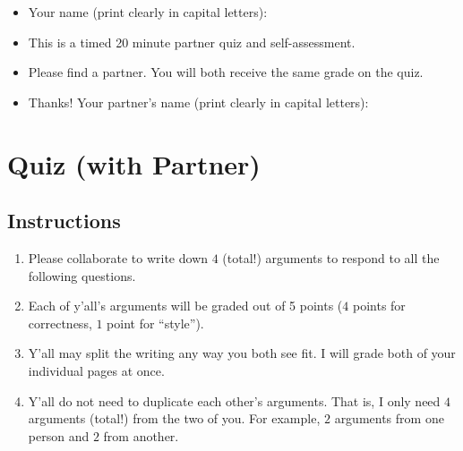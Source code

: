\documentclass{ccg-topic}
\author{Colton Grainger}
\date{\today}
\begin{document}
\maketitle

\begin{itemize}
    \item Your name (print clearly in capital letters): \underline{\hspace{8cm}}
    \item This is a timed 20 minute partner quiz and self-assessment.  
    \item Please find a partner. You will both receive the same grade on the quiz.
    \item Thanks! Your partner's name (print clearly in capital letters): \underline{\hspace{6cm}}
\end{itemize}

\section*{Quiz (with Partner)}
\subsection*{Instructions}
\begin{enumerate}
    \item Please collaborate to write down $4$ (total!) arguments to respond to all the following questions. 
    \item Each of y'all's arguments will be graded out of 5 points ($4$ points for correctness, $1$ point for ``style''). 
    \item Y'all may split the writing any way you both see fit. I will grade both of your individual pages at once. 
    \item Y'all do not need to duplicate each other's arguments. That is, I only need $4$ arguments (total!) from the two of you. For example, $2$ arguments from one person and $2$ from another.
\end{enumerate}
\end{document}
